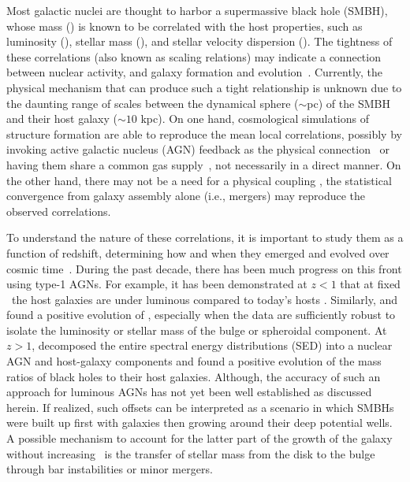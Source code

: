 \documentclass[apj]{emulateapj}
\begin{document}
Most galactic nuclei are thought to harbor a supermassive black hole (SMBH), whose mass (\mbh) is known to be correlated with the host properties, such as luminosity (\lhost), stellar mass (\smass), and stellar velocity dispersion (\sigstar). The tightness of these correlations (also known as scaling relations) may indicate a connection between nuclear activity, and galaxy formation and evolution~\citep[e.g.,][]{Mag++98, F+M00, M+H03, Gul++09,Beifi2012, H+R04, Geb++01b, Gra++2011}. Currently, the physical mechanism that can produce such a tight relationship is unknown due to the daunting range of scales between the dynamical sphere ($\sim$pc) of the SMBH and their host galaxy ($\sim10$ kpc). On one hand, cosmological simulations of structure formation are able to reproduce the mean local correlations, possibly by invoking active galactic nucleus (AGN) feedback as the physical connection~\citep{Springel2005, Hopkins2008, Matteo2008, DeG++15} or having them share a common gas supply~\citep{Cen2015, Menci2016}, not necessarily in a direct manner.
On the other hand, there may not be a need for a physical coupling \citep{Peng2007, Jahnke2011, Hirschmann2010}, the statistical convergence from galaxy assembly alone (i.e., mergers) may reproduce the observed correlations.

To understand the nature of these correlations, it is important to study them as a function of redshift, determining how and when they emerged and evolved over cosmic time~\citep[e.g.,][]{TMB04,Sal++06,Woo++06, Jah++09,SS13,Sun2015}. During the past decade, there has been much progress on this front using type-1 AGNs. For example, it has been demonstrated at $z<1$ that at fixed \mbh\ the host galaxies are under luminous compared to today's hosts \citep{Park15, Tre++07, Pen++06qsob}. Similarly, \citet{Bennert11} and \citet{Woo++08} found a positive evolution of \mbh, especially when the data are sufficiently robust to isolate the luminosity or stellar mass of the bulge or spheroidal component. At $z>1$, \citet{Merloni2010} decomposed the entire spectral energy distributions (SED) into a nuclear AGN and host-galaxy components and found a positive evolution of the mass ratios of black holes to their host galaxies. Although, the accuracy of such an approach for luminous AGNs has not yet been well established as discussed herein. If realized, such offsets can be interpreted as a scenario in which SMBHs were built up first with galaxies then growing around their deep potential wells.  A possible mechanism to account for the latter part of the growth of the galaxy without increasing \mbh\ is the transfer of stellar mass from the disk to the bulge \citep{Bennert++2011} through bar instabilities or minor mergers. 
\end{document}
